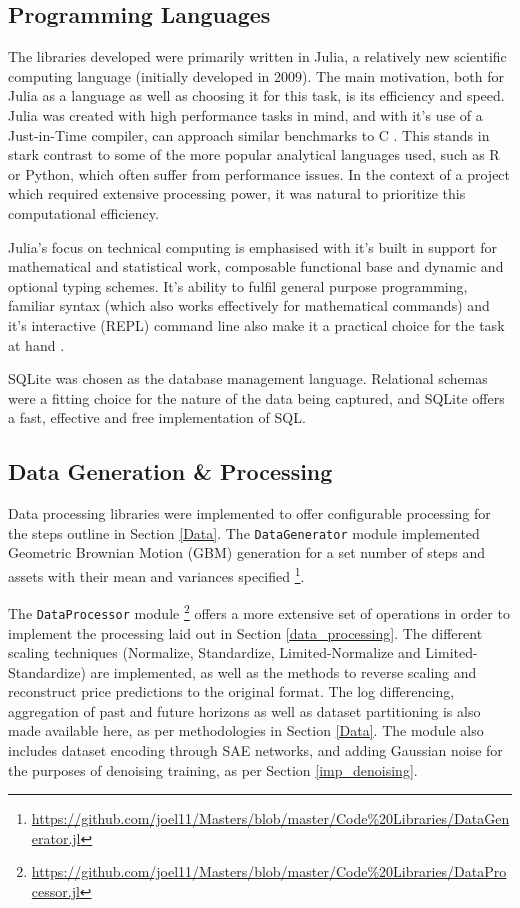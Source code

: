 \documentclass[a4paper,11pt,oneside]{article}
\theoremstyle{plain}
\theoremstyle{definition}
\begin{document}
	
	\subsection{Programming Languages}
	
	The libraries developed were primarily written in Julia, a relatively new scientific computing language (initially developed in 2009). The main motivation, both for Julia as a language as well as choosing it for this task, is its efficiency and speed. Julia was created with high performance tasks in mind, and with it's use of a Just-in-Time compiler, can approach similar benchmarks to C \cite{Perkel}. This stands in stark contrast to some of the more popular analytical languages used, such as R or Python, which often suffer from performance issues. In the context of a project which required extensive processing power, it was natural to prioritize this computational efficiency. \newline
	
	Julia's focus on technical computing is emphasised with it's built in support for mathematical and statistical work, composable functional base and dynamic and optional typing schemes. It's ability to fulfil general purpose programming, familiar syntax (which also works effectively for mathematical commands) and it's interactive (REPL) command line also make it a practical choice for the task at hand \cite{Perkel}.\newline
	
	SQLite was chosen as the database management language. Relational schemas were a fitting choice for the nature of the data being captured, and SQLite offers a fast, effective and free implementation of SQL.\newline
	
	
	\subsection{Data Generation \& Processing}
	
	Data processing libraries were implemented to offer configurable processing for the steps outline in Section \ref{Data}. The \texttt{DataGenerator} module implemented Geometric Brownian Motion (GBM) generation for a set number of steps and assets with their mean and variances specified \footnote{\url{https://github.com/joel11/Masters/blob/master/Code\%20Libraries/DataGenerator.jl}}. \newline
	
	The \texttt{DataProcessor} module \footnote{\url{https://github.com/joel11/Masters/blob/master/Code\%20Libraries/DataProcessor.jl}} offers a more extensive set of operations in order to implement the processing laid out in Section \ref{data_processing}. The different scaling techniques (Normalize, Standardize, Limited-Normalize and Limited-Standardize) are implemented, as well as the methods to reverse scaling and reconstruct price predictions to the original format. The log differencing, aggregation of past and future horizons as well as dataset partitioning is also made available here, as per methodologies in Section \ref{Data}. The module also includes dataset encoding through SAE networks, and adding Gaussian noise for the purposes of denoising training, as per Section \ref{imp_denoising}.
	
\end{document}
